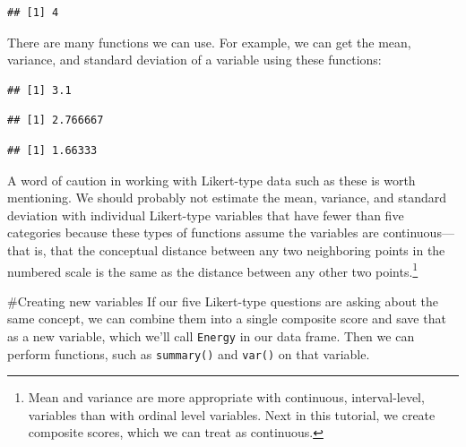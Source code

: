 \documentclass[]{tufte-handout}
\newenvironment{Shaded}{}{}
\newcommand{\KeywordTok}[1]{\textcolor[rgb]{0.00,0.44,0.13}{\textbf{#1}}}
\newcommand{\NormalTok}[1]{#1}
\newcommand{\OperatorTok}[1]{\textcolor[rgb]{0.40,0.40,0.40}{#1}}
\begin{document}
\begin{verbatim}
## [1] 4
\end{verbatim}

There are many functions we can use. For example, we can get the mean,
variance, and standard deviation of a variable using these functions:

\begin{Shaded}
\end{Shaded}

\begin{verbatim}
## [1] 3.1
\end{verbatim}

\begin{Shaded}
\end{Shaded}

\begin{verbatim}
## [1] 2.766667
\end{verbatim}

\begin{Shaded}
\end{Shaded}

\begin{verbatim}
## [1] 1.66333
\end{verbatim}

A word of caution in working with Likert-type data such as these is
worth mentioning. We should probably not estimate the mean, variance,
and standard deviation with individual Likert-type variables that have
fewer than five categories because these types of functions assume the
variables are continuous---that is, that the conceptual distance between
any two neighboring points in the numbered scale is the same as the
distance between any other two points.\footnote{Mean and variance are
  more appropriate with continuous, interval-level, variables than with
  ordinal level variables. Next in this tutorial, we create composite
  scores, which we can treat as continuous.}

\#Creating new variables If our five Likert-type questions are asking
about the same concept, we can combine them into a single composite
score and save that as a new variable, which we'll call \texttt{Energy}
in our data frame. Then we can perform functions, such as
\texttt{summary()} and \texttt{var()} on that variable.
\end{document}
